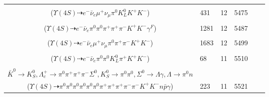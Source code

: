 \documentclass[landscape]{article}
\newcounter{rownumbers}
\newcommand\rn{\stepcounter{rownumbers}\arabic{rownumbers}}
\newcommand{\EOL}{\\} %
\newcommand{\topoTags}[1]{#1} %
\begin{document}
\begin{longtable}{clcccc}
\rn & \makecell[l]{ $ 
\Upsilon(4S) \rightarrow B^{0} \bar{B}^{0} ,
B^{0} \rightarrow \pi^{0} K^{+} K^{-} ,
\bar{B}^{0} \rightarrow e^{-} \bar{\nu}_{e} D^{+} ,
D^{+} \rightarrow \mu^{+} \nu_{\mu} \bar{K}^{0} ,
\bar{K}^{0} \rightarrow K_{L}^{0} 
$ \\ ($
\Upsilon(4S) \dashrightarrow e^{-} \bar{\nu}_{e} \mu^{+} \nu_{\mu} \pi^{0} K_{L}^{0} K^{+} K^{-} 
$) } & \topoTags{431 & }12 & 5475 \EOL

\rn & \makecell[l]{ $ 
\Upsilon(4S) \rightarrow B^{0} \bar{B}^{0} ,
B^{0} \rightarrow \pi^{0} K^{+} K^{-} ,
\bar{B}^{0} \rightarrow e^{-} \bar{\nu}_{e} D^{*+} \gamma^{F} ,
D^{*+} \rightarrow \pi^{+} D^{0} ,
D^{0} \rightarrow \pi^{0} \pi^{+} \pi^{-} 
$ \\ ($
\Upsilon(4S) \dashrightarrow e^{-} \bar{\nu}_{e} \pi^{0} \pi^{0} \pi^{+} \pi^{+} \pi^{-} K^{+} K^{-} \gamma^{F} 
$) } & \topoTags{1281 & }12 & 5487 \EOL

\rn & \makecell[l]{ $ 
\Upsilon(4S) \rightarrow B^{0} \bar{B}^{0} ,
B^{0} \rightarrow \pi^{0} K^{+} K^{-} ,
\bar{B}^{0} \rightarrow e^{-} \bar{\nu}_{e} D^{+} ,
D^{+} \rightarrow \mu^{+} \nu_{\mu} \bar{K}^{0} ,
\bar{K}^{0} \rightarrow K_{S}^{0} ,
K_{S}^{0} \rightarrow \pi^{+} \pi^{-} 
$ \\ ($
\Upsilon(4S) \dashrightarrow e^{-} \bar{\nu}_{e} \mu^{+} \nu_{\mu} \pi^{0} \pi^{+} \pi^{-} K^{+} K^{-} 
$) } & \topoTags{1683 & }12 & 5499 \EOL

\rn & \makecell[l]{ $ 
\Upsilon(4S) \rightarrow B^{0} \bar{B}^{0} ,
B^{0} \rightarrow \pi^{0} K^{+} K^{-} ,
\bar{B}^{0} \rightarrow e^{-} \bar{\nu}_{e} D^{+} ,
D^{+} \rightarrow \pi^{0} K_{L}^{0} \pi^{+} 
$ \\ ($
\Upsilon(4S) \dashrightarrow e^{-} \bar{\nu}_{e} \pi^{0} \pi^{0} K_{L}^{0} \pi^{+} K^{+} K^{-} 
$) } & \topoTags{68 & }11 & 5510 \EOL

\rn & \makecell[l]{ $ 
\Upsilon(4S) \rightarrow B^{0} \bar{B}^{0} ,
B^{0} \rightarrow \pi^{0} K^{+} K^{-} ,
\bar{B}^{0} \rightarrow K^{*-} \bar{\Lambda} \Sigma_{c}^{+} ,
K^{*-} \rightarrow \pi^{-} \bar{K}^{0} ,
\bar{\Lambda} \rightarrow \pi^{+} \bar{p} ,
\Sigma_{c}^{+} \rightarrow \pi^{0} \Lambda_{c}^{+} ,
$ \\ $
\bar{K}^{0} \rightarrow K_{S}^{0} ,
\Lambda_{c}^{+} \rightarrow \pi^{0} \pi^{+} \pi^{+} \pi^{-} \Sigma^{0} ,
K_{S}^{0} \rightarrow \pi^{0} \pi^{0} ,
\Sigma^{0} \rightarrow \Lambda \gamma ,
\Lambda \rightarrow \pi^{0} n 
$ \\ ($
\Upsilon(4S) \dashrightarrow \pi^{0} \pi^{0} \pi^{0} \pi^{0} \pi^{0} \pi^{0} \pi^{+} \pi^{+} \pi^{+} \pi^{-} \pi^{-} K^{+} K^{-} n \bar{p} \gamma 
$) } & \topoTags{223 & }11 & 5521 \EOL


\end{longtable}
\end{document}
